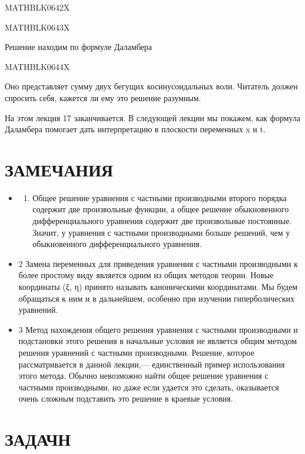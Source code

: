 \documentclass[
]{article}
\providecommand{\tightlist}{%
  \setlength{\itemsep}{0pt}\setlength{\parskip}{0pt}}
\begin{document}
{{MATHBLK0642X

MATHBLK0643X

Решение находим по формуле Даламбера

MATHBLK0644X

Оно представляет сумму двух бегущих косинусоидальных воли. Читатель
должен спросить себя, кажется ли ему это решение разумным.

На этом лекция 17 заканчивается. В следующей лекции мы покажем, как
формула Даламбера помогает дать интерпретацию в плоскости переменных x и
t.

\section{ЗАМЕЧАНИЯ}\label{ux437ux430ux43cux435ux447ux430ux43dux438ux44f-2}

\begin{itemize}
\item
  \begin{enumerate}
  \def\labelenumi{\arabic{enumi}.}
  \tightlist
  \item
    Общее решение уравнения с частными производными второго порядка
    содержит две произвольные функции, а общее решение обыкновенного
    дифференциального уравнения содержит две произвольные постоянные.
    Значит, у уравнения с частными производными больше решений, чем у
    обыкновенного дифференциального уравнения.
  \end{enumerate}
\item
  2 Замена переменных для приведения уравнения с частными производными к
  более простому виду является одним из общих методов теории. Новые
  координаты (ξ, η) принято называть каноническими координатами. Мы
  будем обращаться к ним и в дальнейшем, особенно при изучении
  гиперболических уравнений.
\item
  3 Метод нахождения общего решения уравнения с частными производными и
  подстановки этого решения в начальные условия не является общим
  методом решения уравнений с частными производными. Решение, которое
  рассматривается в данной лекции,--- единственный пример использования
  этого метода. Обычно невозможно найти общее решение уравнения с
  частными производными, но даже если удается это сделать, оказывается
  очень сложным подставить это решение в краевые условия.
\end{itemize}

\section{ЗАДАЧН}\label{ux437ux430ux434ux430ux447ux43d}

}}
\end{document}
